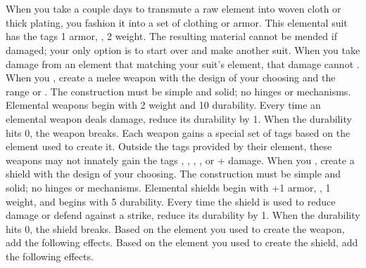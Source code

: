 \documentclass[darkmode]{dw_playbook}
\begin{document}
\clearpage
~

\pageThree
    {
        \begin{minipage}[t]{\textwidth}
            \\
        \end{minipage}
    }
    {
            {When you take a couple days to transmute a raw element into woven cloth or thick plating, you fashion it into a set of clothing or armor.  This elemental suit has the tags 1 armor, , 2 weight.  The resulting material cannot be mended if damaged; your only option is to start over and make another suit.
            \gap
            When you take damage from an element that matching your suit’s element, that damage cannot .}
        \gap
            {When you , create a melee weapon with the design of your choosing and the range  or .
            \gap
            The construction must be simple and solid; no hinges or mechanisms.  Elemental weapons begin with 2 weight and 10 durability.  Every time an elemental weapon deals damage, reduce its durability by 1.  When the durability hits 0, the weapon breaks.
            \gap
            Each weapon gains a special set of tags based on the element used to create it.  Outside the tags provided by their element, these weapons may not innately gain the tags , , , , or + damage.
            \gapSm
            \gapSm
            \gapSm
            }
            {When you , create a shield with the design of your choosing.  The construction must be simple and solid; no hinges or mechanisms.  Elemental shields begin with +1 armor, , 1 weight, and begins with 5 durability.
            \gap
            Every time the shield is used to reduce damage or defend against a strike, reduce its durability by 1.  When the durability hits 0, the shield breaks.  Based on the element you used to create the weapon, add the following effects.
            \gap
            Based on the element you used to create the shield, add the following effects.
            \gapSm
            \gapSm
            \gapSm
            }
    }
    {
        ~
    }
\end{document}
